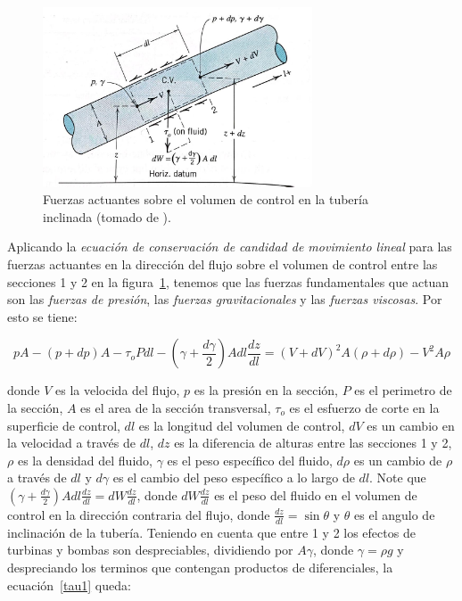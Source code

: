\documentclass[10pt, oneside]{article}
\begin{document}
\begin{figure}[h]
\centering
\includegraphics[width=8cm]{tau.jpeg}
\caption{Fuerzas actuantes sobre el volumen de control en la tuber\'ia inclinada (tomado de \cite{street471elementary}).}
\label{tau}
\end{figure}

Aplicando la \emph{ecuaci\'on de conservaci\'on de candidad de movimiento lineal} para las fuerzas actuantes en la direcci\'on del flujo sobre el volumen de control entre las secciones 1 y 2 en la  figura~\ref{tau}, tenemos que las fuerzas fundamentales que actuan son las \emph{fuerzas de presi\'on}, las \emph{fuerzas gravitacionales} y las \emph{fuerzas viscosas}. Por esto se tiene:

\begin{equation}
pA - (p+dp)A - \tau_{o} P dl - \left( \gamma + \frac{d \gamma}{2} \right)A dl \frac{dz}{dl} = (V+dV)^2 A (\rho +d \rho)- V^2 A \rho
\label{tau1}
\end{equation}

donde $V$ es la velocida del flujo, $p$ es la presi\'on en la secci\'on, $P$ es el perimetro de la secci\'on, $A$ es el area de la secci\'on transversal, $\tau_{o}$ es el esfuerzo de corte en la superficie de control, $dl$ es la longitud del volumen de control, $dV$ es un cambio en la velocidad a trav\'es de $dl$, $dz$ es la diferencia de alturas entre las secciones 1 y 2, $\rho$ es la densidad del fluido, $\gamma$ es el peso espec\'ifico del fluido, $d \rho$ es un cambio de $\rho$ a trav\'es de $dl$ y $d \gamma$ es el cambio del peso espec\'ifico a lo largo de $dl$. Note que $\left( \gamma + \frac{d \gamma}{2} \right) A dl \frac{dz}{dl} = dW \frac{dz}{dl}$, donde $dW \frac{dz}{dl}$ es el peso del fluido en el volumen de control en la direcci\'on contraria del flujo, donde $\frac{dz}{dl}=\sin \theta$ y $\theta$ es el angulo de inclinaci\'on de la tuber\'ia. Teniendo en cuenta que entre 1 y 2 los efectos de turbinas y bombas son despreciables, dividiendo por $A\gamma$, donde $\gamma = \rho g$ y despreciando los terminos que contengan productos de diferenciales,  la ecuaci\'on~\ref{tau1} queda: 
 
\end{document}
